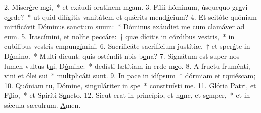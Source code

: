 2. Miser\uline{é}re m\uline{e}i,~* et exáudi oratinem m\uline{e}am.
3. Fílii hóminum, úsquequo gr\uline{a}vi c\uline{o}rde?~* ut quid dilígitis vanitátem et quǽrits mend\uline{á}cium?
4. Et scitóte quóniam mirificávit Dóminus s\uline{a}nctum s\uline{u}um:~* Dóminus exáudiet me cum clamáver ad \uline{e}um.
5. Irascímini, et nolíte peccáre:~† quæ dícitis in c\uline{ó}rdibus v\uline{e}stris,~* in cubílibus vestris cmpung\uline{í}mini.
6. Sacrificáte sacrifícium justítiæ,~† et sper\uline{á}te in D\uline{ó}mino.~* Multi dicunt: quis osténdit nbis b\uline{o}na?
7. Signátum est super nos lumen vultus t\uline{u}i, D\uline{ó}mine:~* dedísti lætítiam in crde m\uline{e}o.
8. A fructu fruménti, vini et \uline{ó}lei s\uline{u}i~* multplic\uline{á}ti sunt.
9. In pace \uline{i}n id\uline{í}psum~* dórmiam et rqui\uline{é}scam;
10. Quóniam tu, Dómine, singul\uline{á}riter \uline{i}n spe~* consttu\uline{í}sti me.
11. Glória P\uline{a}tri, et F\uline{í}lio,~* et Spiríti S\uline{a}ncto.
12. Sicut erat in princípio, et n\uline{u}nc, et s\uline{e}mper,~* et in sǽcula sæculrum. \uline{A}men.
